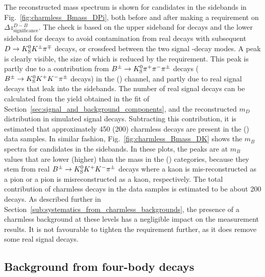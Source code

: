 The reconstructed \B mass spectrum is shown for \BtoDpi candidates in the \D sidebands in Fig.~\ref{fig:charmless_Bmass_DPi}, both before and after making a requirement on $\Delta z^{D-B}_{\text{significance}}$. The check is based on the upper \D sideband for \DtoKspipi decays and the lower \D sideband for \DtoKsKK decays to avoid contamination from real \BtoDh decays with subsequent ${D}\rightarrow{\ensuremath{{K}^0_{\mathrm{S}}}}{\ensuremath{{K}^\pm}}{\ensuremath{{\pi}^\mp}}$ decays, or crossfeed between the two signal \D-decay modes. A peak is clearly visible, the size of which is reduced by the requirement. This peak is partly due to a contribution from ${{B}^\pm}\rightarrow{\ensuremath{{K}^0_{\mathrm{S}}}}{\ensuremath{{\pi}^+}}{\ensuremath{{\pi}^-}}{\ensuremath{{\pi}^\pm}}$ decays (${{{B}^\pm}\rightarrow{\ensuremath{{K}^0_{\mathrm{S}}}}{\ensuremath{{K}^+}}{\ensuremath{{K}^-}}{\ensuremath{{\pi}^\pm}}}$ decays) in the \DtoKspipi (\DtoKsKK) channel, and partly due to real signal decays that leak into the \D sidebands. The number of real signal decays can be calculated from the yield obtained in the fit of Section~\ref{sec:signal_and_background_components}, and the reconstructed $m_D$ distribution in simulated signal decays. Subtracting this contribution, it is estimated that approximately 450 (200) charmless decays are present in the \Kspipi (\KsKK) data samples. In similar fashion, Fig.~\ref{fig:charmless_Bmass_DK} shows the $m_B$ spectra for \BtoDK candidates in the \D sidebands. In these plots, the peaks are at $m_B$ values that are lower (higher) than the \B mass in the \KsPiPi (\KsKK) categories, because they stem from real ${{B}^\pm}\rightarrow{\ensuremath{{K}^0_{\mathrm{S}}}}{\ensuremath{{K}^+}}{\ensuremath{{K}^-}}{\ensuremath{{\pi}^\pm}}$ decays where a kaon is mis-reconstructed as a pion or a pion is misreconstructed as a kaon, respectively. The total contribution of charmless decays in the \BtoDK data samples is estimated to be about 200 decays. As described further in Section~\ref{sub:systematics_from_charmless_backgrounds}, the presence of a charmless background at these levels has a negligible impact on the measurement results. It is not favourable to tighten the requirement further, as it does remove some real signal decays.


\subsection{\texorpdfstring{Background from four-body \D decays}{Background from four-body D decays}}%
\label{sub:background_from_four_body_d_decays}

